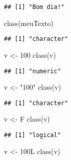 \documentclass[
]{article}
\newenvironment{Shaded}{\begin{snugshade}}{\end{snugshade}}
\newcommand{\DecValTok}[1]{\textcolor[rgb]{0.00,0.00,0.81}{#1}}
\newcommand{\FunctionTok}[1]{\textcolor[rgb]{0.00,0.00,0.00}{#1}}
\newcommand{\NormalTok}[1]{#1}
\newcommand{\OtherTok}[1]{\textcolor[rgb]{0.56,0.35,0.01}{#1}}
\newcommand{\StringTok}[1]{\textcolor[rgb]{0.31,0.60,0.02}{#1}}
\begin{document}
\begin{verbatim}
## [1] "Bom dia!"
\end{verbatim}

\begin{Shaded}
\begin{Highlighting}[]
\FunctionTok{class}\NormalTok{(meuTexto)}
\end{Highlighting}
\end{Shaded}

\begin{verbatim}
## [1] "character"
\end{verbatim}

\begin{Shaded}
\begin{Highlighting}[]
\NormalTok{v }\OtherTok{\textless{}{-}} \DecValTok{100}
\FunctionTok{class}\NormalTok{(v)}
\end{Highlighting}
\end{Shaded}

\begin{verbatim}
## [1] "numeric"
\end{verbatim}

\begin{Shaded}
\begin{Highlighting}[]
\NormalTok{v }\OtherTok{\textless{}{-}} \StringTok{"100"}
\FunctionTok{class}\NormalTok{(v)}
\end{Highlighting}
\end{Shaded}

\begin{verbatim}
## [1] "character"
\end{verbatim}

\begin{Shaded}
\begin{Highlighting}[]
\NormalTok{v }\OtherTok{\textless{}{-}}\NormalTok{ F}
\FunctionTok{class}\NormalTok{(v)}
\end{Highlighting}
\end{Shaded}

\begin{verbatim}
## [1] "logical"
\end{verbatim}

\begin{Shaded}
\begin{Highlighting}[]
\NormalTok{v }\OtherTok{\textless{}{-}}\NormalTok{ 100L }
\FunctionTok{class}\NormalTok{(v)}
\end{Highlighting}
\end{Shaded}
\end{document}
